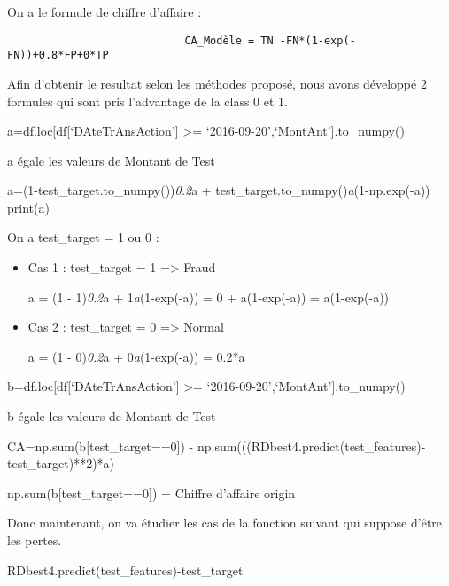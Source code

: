 \documentclass[11pt]{article}
\begin{document}
    On a le formule de chiffre d'affaire :

    \begin{verbatim}
                            CA_Modèle = TN -FN*(1-exp(-FN))+0.8*FP+0*TP
\end{verbatim}

    Afin d'obtenir le resultat selon les méthodes proposé, nous avons
développé 2 formules qui sont pris l'advantage de la class 0 et 1.

    a=df.loc{[}df{[}`DAteTrAnsAction'{]} \textgreater=
`2016-09-20',`MontAnt'{]}.to\_numpy()

a égale les valeurs de Montant de Test

a=(1-test\_target.to\_numpy())\emph{0.2}a +
test\_target.to\_numpy()\emph{a}(1-np.exp(-a)) print(a)

On a test\_target = 1 ou 0 :

\begin{itemize}
\item
  Cas 1 : test\_target = 1 =\textgreater{} Fraud

  a = (1 - 1)\emph{0.2}a + 1\emph{a}(1-exp(-a)) = 0 + a(1-exp(-a)) =
  a(1-exp(-a))
\item
  Cas 2 : test\_target = 0 =\textgreater{} Normal

  a = (1 - 0)\emph{0.2}a + 0\emph{a}(1-exp(-a)) = 0.2*a
\end{itemize}

b=df.loc{[}df{[}`DAteTrAnsAction'{]} \textgreater=
`2016-09-20',`MontAnt'{]}.to\_numpy()

b égale les valeurs de Montant de Test

CA=np.sum(b{[}test\_target==0{]}) -
np.sum(((RDbest4.predict(test\_features)-test\_target)**2)*a)

np.sum(b{[}test\_target==0{]}) = Chiffre d'affaire origin

Donc maintenant, on va étudier les cas de la fonction suivant qui
suppose d'être les pertes.

RDbest4.predict(test\_features)-test\_target
\end{document}

